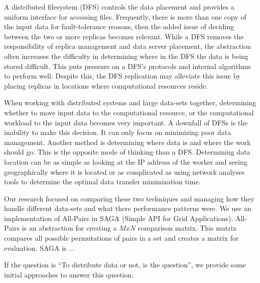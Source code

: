 \documentclass{rspublic}
\newcommand{\micnote}[1]{ {\textcolor{blue} { ***Michael: #1 }}} \else
\newcommand{\jhanote}[1]{} \newcommand{\micnote}[1]{} \newcommand{\fixme}[1]{}
\begin{document}
A distributed filesystem (DFS) controls the data placement and provides
a uniform interface for accessing files.  Frequently, there is more than
one copy of the input data for fault-tolerance reasons, then the added
issue of deciding between the two or more replicas becomes relevant.
While a DFS removes the responsibility of replica management and data
server placement, the abstraction often increases the difficulty in
determining where in the DFS the data is being stored difficult.  This
puts pressure on a DFS's protocols and internal algorithms to perform
well.  Despite this, the DFS replication may alleviate this issue by
placing replicas in locations where computational resources reside.

When working with distributed systems and large data-sets together,
determining whether to move input data to the computational resource, or
the computational workload to the input data becomes very important.  A
downfall of DFSs is the inability to make this decision.  It can only
focus on minimizing poor data management.  Another method is determining
where data is and where the work should go.  This is the opposite mode
of thinking than a DFS.  Determining data location can be as simple as
looking at the IP address of the worker and seeing geographically where
it is located or as complicated as using network analyses tools to
determine the optimal data transfer minimization time.

Our research focused on comparing these two techniques and managing how
they handle different data-sets and what there performance patterns
were.  We use an implementation of All-Pairs in SAGA (Simple API for
Grid Applications).  All-Pairs is an abstraction for creating a $MxN$
comparison matrix.  This matrix compares all possible permutations of
pairs in a set and creates a matrix for evaluation.  SAGA is ...

If the question is ``To distribute data or not, is the question'', we
provide some initial approaches to answer this question.


\end{document}
